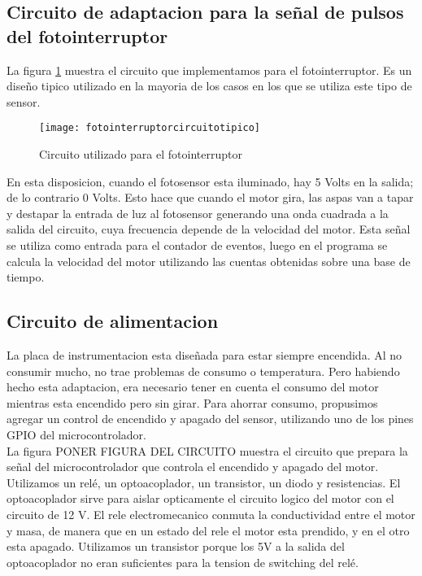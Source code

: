 \subsection{Circuito de adaptacion para la señal de pulsos del fotointerruptor} %
\label{sub:circuito_de_adaptacion_para_la_señal_de_pulsos_del_fotointerruptor}

La figura \ref{fig:fotointerruptorcircuitotipico} muestra el circuito que implementamos para el fotointerruptor. Es un diseño tipico utilizado en la mayoria de los casos en los que se utiliza este tipo de sensor. 

\begin{figure}[h]
  \centering
  \texttt{[image: fotointerruptorcircuitotipico]}
  \caption{Circuito utilizado para el fotointerruptor}\label{fig:fotointerruptorcircuitotipico}
\end{figure}

En esta disposicion, cuando el fotosensor esta iluminado, hay 5 Volts en la salida; de lo contrario 0 Volts. Esto hace que cuando el motor gira, las aspas van a tapar y destapar la entrada de luz al fotosensor generando una onda cuadrada a la salida del circuito, cuya frecuencia depende de la velocidad del motor.
Esta señal se utiliza como entrada para el contador de eventos, luego en el programa se calcula la velocidad del motor utilizando las cuentas obtenidas sobre una base de tiempo. 


\subsection{Circuito de alimentacion} %
\label{sub:circuito_de_alimentacion}

La placa de instrumentacion esta diseñada para estar siempre encendida. Al no consumir mucho, no trae problemas de consumo o temperatura. Pero habiendo hecho esta adaptacion, era necesario tener en cuenta el consumo del motor mientras esta encendido pero sin girar. Para ahorrar consumo, propusimos agregar un control de encendido y apagado del sensor, utilizando uno de los pines GPIO del microcontrolador. \\

La figura PONER FIGURA DEL CIRCUITO muestra el circuito que prepara la señal del microcontrolador que controla el encendido y apagado del motor. Utilizamos un relé, un optoacoplador, un transistor, un diodo y resistencias. El optoacoplador sirve para aislar opticamente el circuito logico del motor con el circuito de 12 V. El rele electromecanico conmuta la conductividad entre el motor y masa, de manera que en un estado del rele el motor esta prendido, y en el otro esta apagado. Utilizamos un transistor porque los 5V a la salida del optoacoplador no eran suficientes para la tension de switching del relé.

